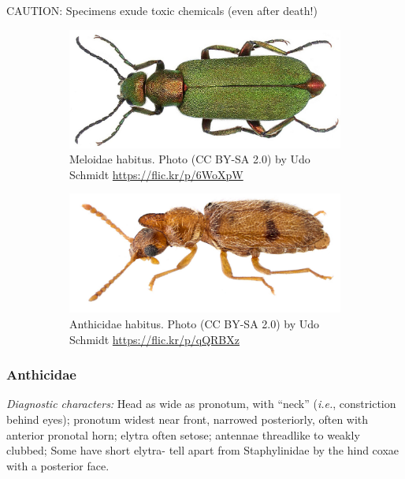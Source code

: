 \documentclass[letterpaper, 11pt]{article}
\begin{document}
\noindent{}CAUTION: Specimens exude toxic chemicals (even after death!)\\

\begin{figure}[ht!]
  \centering
\begin{subfigure}[ht!]{0.43\textwidth}
    \includegraphics[width=\textwidth]{MeloidHabitus}
  \caption{Meloidae habitus. Photo (CC BY-SA 2.0) by Udo Schmidt \url{https://flic.kr/p/6WoXpW}}
  \label{fig:meloid}
\end{subfigure}
    \qquad
\begin{subfigure}[ht!]{0.45\textwidth}
    \includegraphics[width=\textwidth]{AnthicidHabitus}
  \caption{Anthicidae habitus. Photo (CC BY-SA 2.0) by Udo Schmidt \url{https://flic.kr/p/qQRBXz}}
  \label{fig:anthicid}\end{subfigure}
    \caption{}\label{fig:anthmelo}
\end{figure}

\subsubsection{Anthicidae}%
\noindent{}\textit{Diagnostic characters:} Head as wide as pronotum, with ``neck'' (\textit{i.e.}, constriction behind eyes); pronotum widest near front, narrowed posteriorly, often with anterior pronotal horn; elytra often setose; antennae threadlike to weakly clubbed; Some have short elytra- tell apart from Staphylinidae by the hind coxae with a posterior face.\\
\end{document}
